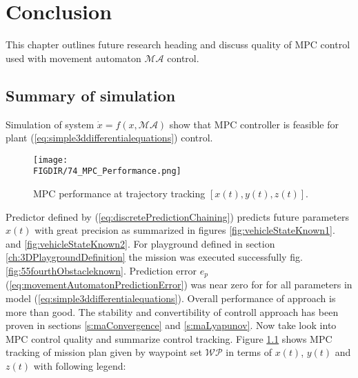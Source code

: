 \chapter{Conclusion}\label{ch:conclusion}
\noindent This chapter outlines future research heading and discuss quality of MPC control used with movement automaton $\mathscr{MA}$ control.

\section{Summary of simulation}
\noindent Simulation of system $\dot{x}=f(x,\mathscr{MA})$ show that MPC controller is feasible for plant (\ref{eq:simple3ddifferentialequations}) control.  
\begin{figure}[H]
    \centering
    \texttt{[image: \\FIGDIR/74\_MPC\_Performance.png]}
    \caption{MPC performance at trajectory tracking $[x(t),y(t),z(t)]$.}
    \label{fig:mpcPerformance}
\end{figure}
\noindent Predictor defined by (\ref{eq:discretePredictionChaining}) predicts future parameters $\hat{x}(t)$ with great precision as summarized in figures \ref{fig:vehicleStateKnown1}. and \ref{fig:vehicleStateKnown2}. For playground defined in section \ref{ch:3DPlaygroundDefinition} the mission was executed successfully fig. \ref{fig:55fourthObstacleknown}. Prediction error $e_p$ (\ref{eq:movementAutomatonPredictionError}) was near zero for for all parameters in model (\ref{eq:simple3ddifferentialequations}). Overall performance of approach is more than good. The stability and convertibility of controll approach has been proven in sections \ref{s:maConvergence} and \ref{s:maLyapunov}. Now take look into MPC control quality and summarize control tracking. Figure \ref{fig:mpcPerformance} shows MPC tracking of mission plan given by waypoint set $\mathscr{WP}$ in terms of $x(t)$, $y(t)$ and $z(t)$ with following legend:
